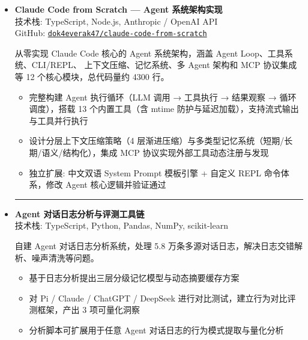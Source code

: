 \documentclass[zh]{resume}
\begin{document}
\begin{itemize}
    \item[\faCode] \textbf{Claude Code from Scratch — Agent 系统架构实现}\\
    技术栈: TypeScript, Node.js, Anthropic / OpenAI API \\
    GitHub: \href{https://github.com/dok4everak47/claude-code-from-scratch}{\texttt{dok4everak47/claude-code-from-scratch}}

    从零实现 Claude Code 核心的 Agent 系统架构，涵盖 Agent Loop、工具系统、CLI/REPL、
    上下文压缩、记忆系统、多 Agent 架构和 MCP 协议集成等 12 个核心模块，总代码量约 4300 行。
    \begin{itemize}
        \item 完整构建 Agent 执行循环（LLM 调用 → 工具执行 → 结果观察 → 循环调度），搭载 13 个内置工具（含 mtime 防护与延迟加载），支持流式输出与工具并行执行
        \item 设计分层上下文压缩策略（4 层渐进压缩）与多类型记忆系统（短期/长期/语义/结构化），集成 MCP 协议实现外部工具动态注册与发现
        \item 独立扩展: 中文双语 System Prompt 模板引擎 + 自定义 REPL 命令体系，修改 Agent 核心逻辑并验证通过
    \end{itemize}

    \vspace{1ex}
    {\color{accentcolor!15}\hrule}
    \vspace{1ex}

    \item[\faCode] \textbf{Agent 对话日志分析与评测工具链}\\
    技术栈: TypeScript, Python, Pandas, NumPy, scikit-learn

    自建 Agent 对话日志分析系统，处理 5.8 万条多源对话日志，解决日志交错解析、噪声清洗等问题。
    \begin{itemize}
        \item 基于日志分析提出三层分级记忆模型与动态摘要缓存方案
        \item 对 Pi / Claude / ChatGPT / DeepSeek 进行对比测试，建立行为对比评测框架，产出 3 项可量化洞察
        \item 分析脚本可扩展用于任意 Agent 对话日志的行为模式提取与量化分析
    \end{itemize}
\end{itemize}
\end{document}
